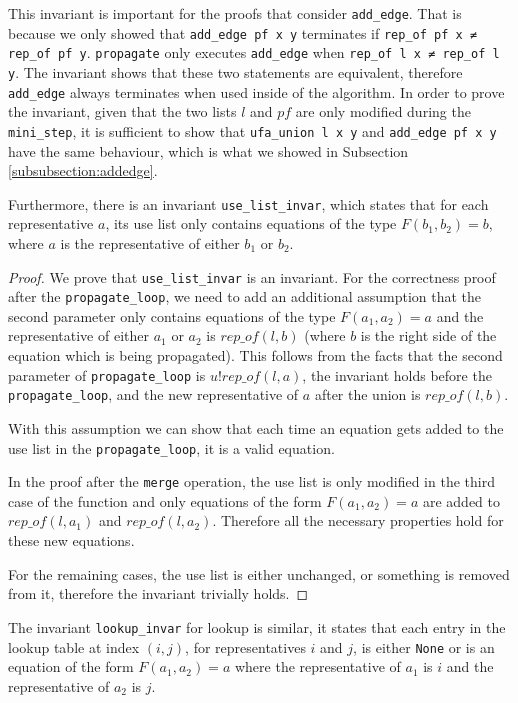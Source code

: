 This invariant is important for the proofs that consider \lstinline{add_edge}. That is because we only showed that \lstinline{add_edge pf x y} terminates if \lstinline{rep_of pf x ≠ rep_of pf y}. \lstinline{propagate} only executes \lstinline{add_edge} when \lstinline{rep_of l x ≠ rep_of l y}. The invariant shows that these two statements are equivalent, therefore \lstinline{add_edge} always terminates when used inside of the algorithm.
In order to prove the invariant, given that the two lists $l$ and $pf$ are only modified during the \lstinline{mini_step}, it is sufficient to show that \lstinline{ufa_union l x y} and \lstinline{add_edge pf x y} have the same behaviour, which is what we showed in Subsection \ref{subsubsection:addedge}.

Furthermore, there is an invariant \lstinline|use_list_invar|, which states that for each representative $a$, its use list only contains equations of the type $F(b_1, b_2) = b$, where $a$ is the representative of either $b_1$ or $b_2$.

\begin{proof}
We prove that \lstinline|use_list_invar| is an invariant.
For the correctness proof after the \lstinline{propagate_loop}, we need to add an additional assumption that the second parameter only contains equations of the type $F(a_1, a_2) = a$ and the representative of either $a_1$ or $a_2$ is $rep\_of(l, b)$ (where $b$ is the right side of the equation which is being propagated). This follows from the facts that the second parameter of \lstinline{propagate_loop} is $u ! rep\_of(l, a)$, the invariant holds before the \lstinline{propagate_loop}, and the new representative of $a$ after the union is $rep\_of(l, b)$.

With this assumption we can show that each time an equation gets added to the use list in the \lstinline{propagate_loop}, it is a valid equation.

In the proof after the \lstinline{merge} operation, the use list is only modified in the third case of the function and only equations of the form $F(a_1, a_2) = a$ are added to $rep\_of(l, a_1)$  and $rep\_of(l, a_2)$. Therefore all the necessary properties hold for these new equations.

For the remaining cases, the use list is either unchanged, or something is removed from it, therefore the invariant trivially holds.
\end{proof}

The invariant \lstinline|lookup_invar| for lookup is similar, it states that each entry in the lookup table at index $(i, j)$, for representatives $i$ and $j$, is either \lstinline{None} or is an equation of the form $F(a_1, a_2) = a$ where the representative of $a_1$ is $i$ and the representative of $a_2$ is $j$.

